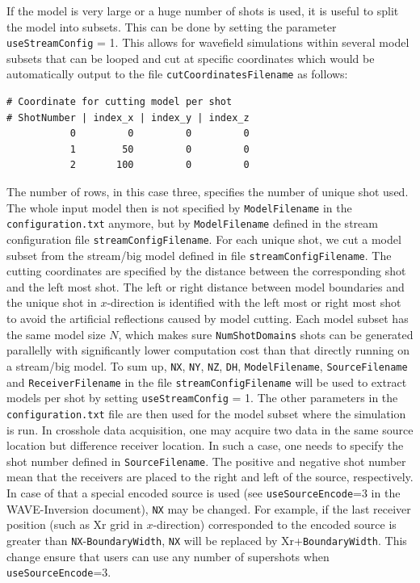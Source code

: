 \documentclass[pdftex,a4paper,parskip,listof=totoc,bibliography=totoc,onehalfspacing,12pt]{scrreprt}
\newcommand{\shellcmd}[1]{\indent\indent\texttt{#1}}	%
\begin{document}
If the model is very large or a huge number of shots is used, it is useful to split the model into subsets. This can be done by setting the parameter \verb+useStreamConfig+ = 1. This allows for wavefield simulations within several model subsets that can be looped and cut at specific coordinates which would be automatically output to the file \verb+cutCoordinatesFilename+ as follows:
\begin{verbatim}
# Coordinate for cutting model per shot 
# ShotNumber | index_x | index_y | index_z
           0         0         0         0
           1        50         0         0
           2       100         0         0
\end{verbatim}
The number of rows, in this case three, specifies the number of unique shot used. The whole input model then is not specified by \verb+ModelFilename+ in the \shellcmd{configuration.txt} anymore, but by \verb+ModelFilename+ defined in the stream configuration file \verb+streamConfigFilename+. For each unique shot, we cut a model subset from the stream/big model defined in file \verb+streamConfigFilename+. The cutting coordinates are specified by the distance between the corresponding shot and the left most shot. The left or right distance between model boundaries and the unique shot in $x$-direction is identified with the left most or right most shot to avoid the artificial reflections caused by model cutting. Each model subset has the same model size $N$, which makes sure \verb+NumShotDomains+ shots can be generated parallelly with significantly lower computation cost than that directly running on a stream/big model. To sum up, \verb+NX+, \verb+NY+, \verb+NZ+, \verb+DH+, \verb+ModelFilename+, \verb+SourceFilename+ and \verb+ReceiverFilename+ in the file \verb+streamConfigFilename+ will be used to extract models per shot by setting \verb+useStreamConfig+ = 1. The other parameters in the \shellcmd{configuration.txt} file are then used for the model subset where the simulation is run. In crosshole data acquisition, one may acquire two data in the same source location but difference receiver location. In such a case, one needs to specify the shot number defined in \verb+SourceFilename+. The positive and negative shot number mean that the receivers are placed to the right and left of the source, respectively. In case of that a special encoded source is used (see \verb+useSourceEncode+=3 in the WAVE-Inversion document), \verb+NX+ may be changed. For example, if the last receiver position (such as Xr grid in $x$-direction) corresponded to the encoded source is greater than \verb+NX+-\verb+BoundaryWidth+, \verb+NX+ will be replaced by Xr+\verb+BoundaryWidth+. This change ensure that users can use any number of supershots when \verb+useSourceEncode+=3.
\end{document}
